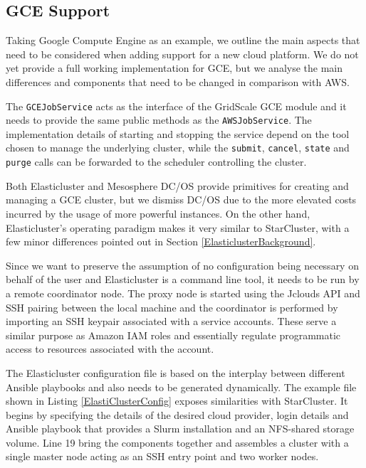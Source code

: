 \subsection{GCE Support}

Taking Google Compute Engine as an example, we outline the main aspects that need to be considered when adding support for a new cloud platform. We do not yet provide a full working implementation for GCE, but we analyse the main differences and components that need to be changed in comparison with AWS.

The \verb|GCEJobService| acts as the interface of the GridScale GCE module and it needs to provide the same public methods as the \verb|AWSJobService|. The implementation details of starting and stopping the service depend on the tool chosen to manage the underlying cluster, while the \verb|submit|, \verb|cancel|, \verb|state| and \verb|purge| calls can be forwarded to the scheduler controlling the cluster.

Both Elasticluster and Mesosphere DC/OS provide primitives for creating and managing a GCE cluster, but we dismiss DC/OS due to the more elevated costs incurred by the usage of more powerful instances. On the other hand, Elasticluster's operating paradigm makes it very similar to StarCluster, with a few minor differences pointed out in Section \ref{ElasticlusterBackground}. 

Since we want to preserve the assumption of no configuration being necessary on behalf of the user and Elasticluster is a command line tool, it needs to be run by a remote coordinator node. The proxy node is started using the Jclouds API and SSH pairing between the local machine and the coordinator is performed by importing an SSH keypair associated with a service accounts. These serve a similar purpose as Amazon IAM roles and essentially regulate programmatic access to resources associated with the account.

The Elasticluster configuration file is based on the interplay between different Ansible playbooks and also needs to be generated dynamically. The example file shown in Listing \ref{ElastiClusterConfig} exposes similarities with StarCluster. It begins by specifying the details of the desired cloud provider, login details and Ansible playbook that provides a Slurm installation and an NFS-shared storage volume. Line 19 bring the components together and assembles a cluster with a single master node acting as an SSH entry point and two worker nodes.

